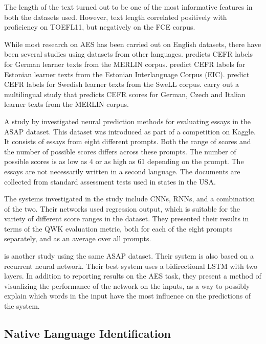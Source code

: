 The length of the text turned out to be one of the most informative features
in both the datasets used. However, text length correlated positively with
proficiency on TOEFL11, but negatively on the FCE corpus.

While most research on \ac{AES} has been carried out on English datasets,
there have been several studies using datasets from other languages.
\textcite{hancke2013} predicts CEFR labels for German learner texts from the
MERLIN corpus. \textcite{vajjalaloo2014} predict CEFR labels for Estonian
learner texts from the Estonian Interlanguage Corpus (EIC).
\textcite{pilan2016} predict CEFR labels for Swedish learner texts from the
SweLL corpus. \textcite{vajjala18universalCEFR} carry out a multilingual
study that predicts CEFR scores for German, Czech and Italian learner texts
from the MERLIN corpus.

A study by \textcite{taghipour16} investigated neural prediction methods for
evaluating essays in the ASAP dataset. This dataset was introduced as part of
a competition on Kaggle. It consists of essays from eight different prompts.
Both the range of scores and the number of possible scores differs across
these prompts. The number of possible scores is as low as 4 or as high as 61
depending on the prompt. The essays are not necessarily written in a second
language. The documents are collected from standard assessment tests used in
states in the USA.

The systems investigated in the study include \acp{CNN}, \acp{RNN}, and a
combination of the two. Their networks used regression output, which is
suitable for the variety of different score ranges in the dataset. They
presented their results in terms of the \ac{QWK} evaluation metric, both for
each of the eight prompts separately, and as an average over all prompts.

\textcite{alikaniotis2016automatic} is another study using the same ASAP
dataset. Their system is also based on a recurrent neural network. Their best
system uses a bidirectional \ac{LSTM} with two layers. In addition to
reporting results on the \ac{AES} task, they present a method of visualizing
the performance of the network on the inputs, as a way to possibly explain
which words in the input have the most influence on the predictions of the
system.


\subsection{Native Language Identification} \label{sec:nli}

